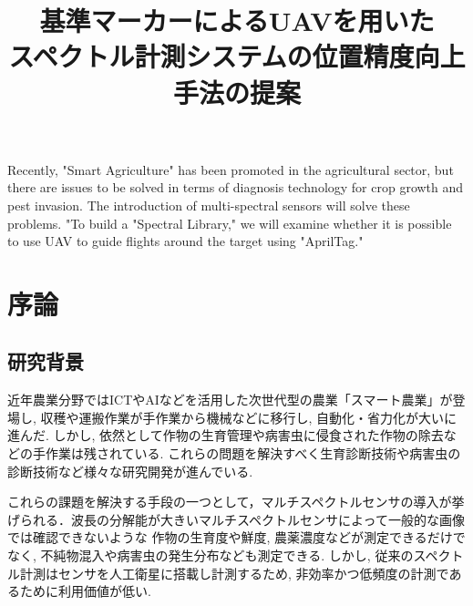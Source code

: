 \documentclass[a4j,fleqn,dvipdfmx,uplatex]{jsarticle}
\begin{document}
%
\title{基準マーカーによるUAVを用いた\\スペクトル計測システムの位置精度向上手法の提案} %
\abst
{Recently, "Smart Agriculture" has been promoted in the agricultural sector, but there are issues to be solved in terms of diagnosis technology 
for crop growth and pest invasion. The introduction of multi-spectral sensors will solve these problems. 
"To build a "Spectral Library," we will examine whether it is possible to use UAV to guide flights around the target using "AprilTag."}

\maketitle
\section{序論}\label{sec1}
\subsection{研究背景}\label{background}
近年農業分野ではICTやAIなどを活用した次世代型の農業「スマート農業\cite{SmartAgri}」が登場し, 収穫や運搬作業が手作業から機械などに移行し, 自動化・省力化が大いに進んだ. 
しかし, 依然として作物の生育管理や病害虫に侵食された作物の除去などの手作業は残されている. 
これらの問題を解決すべく生育診断技術や病害虫の診断技術など様々な研究開発が進んでいる\cite{SMART_AGRI}. 

これらの課題を解決する手段の一つとして，マルチスペクトルセンサの導入が挙げられる．波長の分解能が大きいマルチスペクトルセンサによって一般的な画像では確認できないような
作物の生育度や鮮度, 農薬濃度などが測定できるだけでなく, 不純物混入や病害虫の発生分布なども測定できる\cite{HS}. 
しかし, 従来のスペクトル計測はセンサを人工衛星に搭載し計測するため, 非効率かつ低頻度の計測であるために利用価値が低い. 
\end{document}
